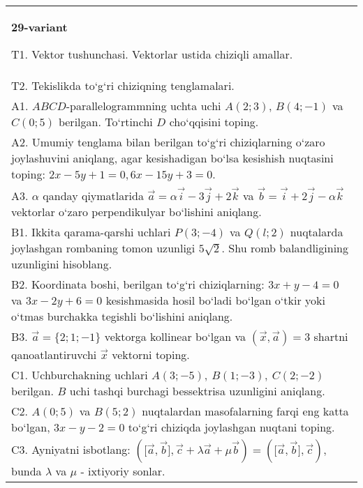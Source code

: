 \documentclass{article}
\begin{document}
\begin{tabular}{m{17cm}}
\textbf{29-variant}
\newline

T1. 
Vektor tushunchasi. Vektorlar ustida chiziqli amallar.
 \\
T2. 
Tekislikda to‘g‘ri chiziqning tenglamalari.
 \\
A1. 
$ABCD$-parallelogrammning uchta uchi
$A (2;3) $, $B (4;-1) $ va $C (0;5) $ berilgan. To‘rtinchi $D$
cho‘qqisini toping.
 \\
A2. 
Umumiy tenglama bilan berilgan to‘g‘ri chiziqlarning
o‘zaro joylashuvini aniqlang, agar kesishadigan bo‘lsa kesishish nuqtasini
toping: $2x-5y+1=0, 6x-15y+3=0$.
 \\
A3. 
$\alpha$
qanday qiymatlarida 
$\overrightarrow{a} = \alpha\overrightarrow{i} - 3\overrightarrow{j} + 2\overrightarrow{k}$
va
$\overrightarrow{b} = \overrightarrow{i} + 2\overrightarrow{j} - \alpha\overrightarrow{k}$
vektorlar o‘zaro perpendikulyar bo‘lishini aniqlang.
 \\
B1. 
Ikkita qarama-qarshi uchlari $P (3; -4) $ va $Q (l;2) $ nuqtalarda joylashgan rombaning tomon uzunligi \(5\sqrt{2}\). Shu romb balandligining uzunligini hisoblang.
 \\
B2. 
Koordinata boshi, berilgan to‘g‘ri chiziqlarning:
\(3x+y-4=0\) va \(3x-2y+6=0\) kesishmasida hosil bo‘ladi
bo‘lgan o‘tkir yoki o‘tmas burchakka tegishli bo‘lishini aniqlang.
 \\
B3. 
$\vec{a} = \{ 2;1; - 1\}$ vektorga kollinear bo‘lgan va $\left(\vec{x},\vec{a} \right) = 3$ shartni qanoatlantiruvchi $\vec{x}$ vektorni toping.
 \\
C1. 
Uchburchakning uchlari
\(A (3; - 5),\ B (1; - 3),\ C (2; - 2) \) berilgan. $B$ uchi tashqi
burchagi bessektrisa uzunligini aniqlang.
 \\
C2. 
\(A (0;5) \) va \(B (5;2) \) nuqtalardan masofalarning
farqi eng katta bo‘lgan, \(3x - y - 2 = 0\) to‘g‘ri chiziqda joylashgan
nuqtani toping.
 \\
C3. 
Ayniyatni isbotlang: \((\lbrack\vec{a},\vec{b}\rbrack,\vec{c} + \lambda\vec{a} + \mu\vec{b}) = (\lbrack\vec{a},\vec{b}\rbrack,\vec{c}) \), bunda \(\lambda\) va \(\mu\) - ixtiyoriy sonlar. \\

\end{tabular}
\vspace{1cm}
\end{document}
